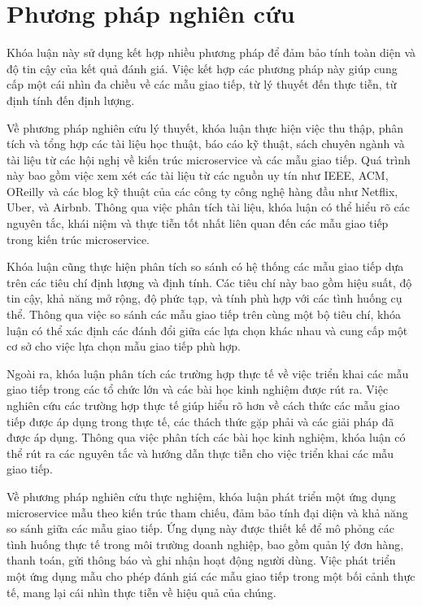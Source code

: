 \section{Phương pháp nghiên cứu}
Khóa luận này sử dụng kết hợp nhiều phương pháp để đảm bảo tính toàn diện và độ tin cậy của kết quả đánh giá. Việc kết hợp các phương pháp này giúp cung cấp một cái nhìn đa chiều về các mẫu giao tiếp, từ lý thuyết đến thực tiễn, từ định tính đến định lượng.

Về phương pháp nghiên cứu lý thuyết, khóa luận thực hiện việc thu thập, phân tích và tổng hợp các tài liệu học thuật, báo cáo kỹ thuật, sách chuyên ngành và tài liệu từ các hội nghị về kiến trúc microservice và các mẫu giao tiếp. Quá trình này bao gồm việc xem xét các tài liệu từ các nguồn uy tín như IEEE, ACM, OReilly và các blog kỹ thuật của các công ty công nghệ hàng đầu như Netflix, Uber, và Airbnb. Thông qua việc phân tích tài liệu, khóa luận có thể hiểu rõ các nguyên tắc, khái niệm và thực tiễn tốt nhất liên quan đến các mẫu giao tiếp trong kiến trúc microservice.

Khóa luận cũng thực hiện phân tích so sánh có hệ thống các mẫu giao tiếp dựa trên các tiêu chí định lượng và định tính. Các tiêu chí này bao gồm hiệu suất, độ tin cậy, khả năng mở rộng, độ phức tạp, và tính phù hợp với các tình huống cụ thể. Thông qua việc so sánh các mẫu giao tiếp trên cùng một bộ tiêu chí, khóa luận có thể xác định các đánh đổi giữa các lựa chọn khác nhau và cung cấp một cơ sở cho việc lựa chọn mẫu giao tiếp phù hợp.

Ngoài ra, khóa luận phân tích các trường hợp thực tế về việc triển khai các mẫu giao tiếp trong các tổ chức lớn và các bài học kinh nghiệm được rút ra. Việc nghiên cứu các trường hợp thực tế giúp hiểu rõ hơn về cách thức các mẫu giao tiếp được áp dụng trong thực tế, các thách thức gặp phải và các giải pháp đã được áp dụng. Thông qua việc phân tích các bài học kinh nghiệm, khóa luận có thể rút ra các nguyên tắc và hướng dẫn thực tiễn cho việc triển khai các mẫu giao tiếp.

Về phương pháp nghiên cứu thực nghiệm, khóa luận phát triển một ứng dụng microservice mẫu theo kiến trúc tham chiếu, đảm bảo tính đại diện và khả năng so sánh giữa các mẫu giao tiếp. Ứng dụng này được thiết kế để mô phỏng các tình huống thực tế trong môi trường doanh nghiệp, bao gồm quản lý đơn hàng, thanh toán, gửi thông báo và ghi nhận hoạt động người dùng. Việc phát triển một ứng dụng mẫu cho phép đánh giá các mẫu giao tiếp trong một bối cảnh thực tế, mang lại cái nhìn thực tiễn về hiệu quả của chúng.

